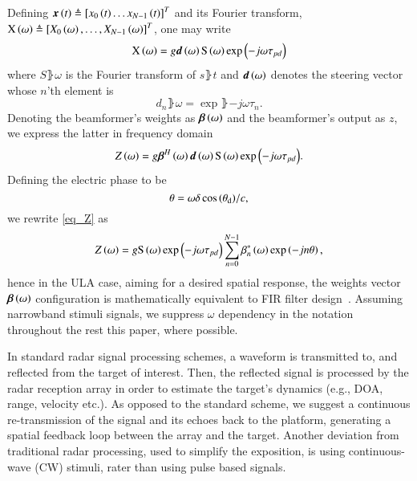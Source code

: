 Defining $\boldsymbol{x}\left({t}\right)\triangleq\left[{x_{0}\left({t}\right)\hdots{}x_{N-1}\left({t}\right)}\right]^{T}$ and its Fourier transform, $\vecnot{\F{x}}\rBrace{\omega}\triangleq\vBrace{X_{0}\rBrace{\omega},\hdots,X_{N-1}\rBrace{\omega}}^{T}$, one may write 
\[
\vecnot{\F{x}}\rBrace{\omega}=g\vecnot{d}\rBrace{\omega}\F{s}\rBrace{\omega}\exp{\rBrace{-j\omega\tau_{pd}}}
\]
where $S\rBrace{\omega}$ is the Fourier transform of $s\rBrace{t}$ and $\boldsymbol{d}\left({\omega}\right)$ denotes the steering vector whose $n$'th element is
\begin{equation}
    \label{eq:d}
    d_{n}\rBrace{\omega} = \exp{\rBrace{-j\omega\tau_{n}}}.
\end{equation}
Denoting the beamformer's weights as $\vBeta\rBrace{\omega}$ and the beamformer's output as $z$, we express the latter in frequency domain
\begin{equation}
    \label{eq_Z}
    Z\rBrace{\omega} = g\vecnot{\beta}^{H}\rBrace{\omega}\vecnot{d}\rBrace{\omega}\F{s}\rBrace{\omega}\exp{\rBrace{-j\omega\tau_{pd}}}.
\end{equation}
Defining the electric phase to be
\begin{equation}\label{eq:thetaULA}
\theta=\omega{\delta\cos\Brack{\thetaD}}/{c},
\end{equation}
we rewrite \eqref{eq_Z} as 
\[
Z\rBrace{\omega} = g\F{s}\rBrace{\omega}\exp{\rBrace{-j\omega\tau_{pd}}}\sum_{n=0}^{N-1}\beta^{*}_{n}\rBrace{\omega}\exp\Brack{-jn\theta},
\]
hence in the ULA case, aiming for a desired spatial response, the weights vector $\boldsymbol{\beta}\left({\omega}\right)$ configuration is mathematically equivalent to FIR filter design~\cite{van1988beamforming,benesty2018}. 
\ifdefined\useOmega \else 
Assuming narrowband stimuli signals, we suppress $\omega$ dependency in the notation throughout the rest this paper, where possible.
\fi
\par In standard radar signal processing schemes, a waveform is transmitted to, and reflected from the target of interest. Then, the reflected signal is processed by the radar reception array in order to estimate the target's dynamics (e.g., DOA, range, velocity etc.). 
As opposed to the standard scheme, we suggest a continuous re-transmission of the signal and its echoes back to the platform, generating a spatial feedback loop between the array and the target.
Another deviation from traditional radar processing, used to simplify the exposition, is using continuous-wave (CW) stimuli, rater than using pulse based signals. 
